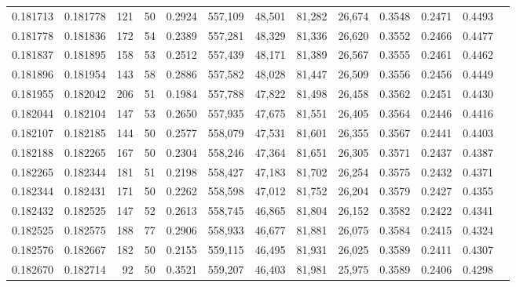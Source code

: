 \begin{tabular}{rrrrrrrrrrrrr}
0.181713 & 0.181778 &   121 &  50 &                                     0.2924 & 557,109 &  48,501 &  81,282 &  26,674 & 0.3548 & 0.2471 & 0.4493 \\
0.181778 & 0.181836 &   172 &  54 &                                     0.2389 & 557,281 &  48,329 &  81,336 &  26,620 & 0.3552 & 0.2466 & 0.4477 \\
0.181837 & 0.181895 &   158 &  53 &                                     0.2512 & 557,439 &  48,171 &  81,389 &  26,567 & 0.3555 & 0.2461 & 0.4462 \\
0.181896 & 0.181954 &   143 &  58 &                                     0.2886 & 557,582 &  48,028 &  81,447 &  26,509 & 0.3556 & 0.2456 & 0.4449 \\
0.181955 & 0.182042 &   206 &  51 &                                     0.1984 & 557,788 &  47,822 &  81,498 &  26,458 & 0.3562 & 0.2451 & 0.4430 \\
0.182044 & 0.182104 &   147 &  53 &                                     0.2650 & 557,935 &  47,675 &  81,551 &  26,405 & 0.3564 & 0.2446 & 0.4416 \\
0.182107 & 0.182185 &   144 &  50 &                                     0.2577 & 558,079 &  47,531 &  81,601 &  26,355 & 0.3567 & 0.2441 & 0.4403 \\
0.182188 & 0.182265 &   167 &  50 &                                     0.2304 & 558,246 &  47,364 &  81,651 &  26,305 & 0.3571 & 0.2437 & 0.4387 \\
0.182265 & 0.182344 &   181 &  51 &                                     0.2198 & 558,427 &  47,183 &  81,702 &  26,254 & 0.3575 & 0.2432 & 0.4371 \\
0.182344 & 0.182431 &   171 &  50 &                                     0.2262 & 558,598 &  47,012 &  81,752 &  26,204 & 0.3579 & 0.2427 & 0.4355 \\
0.182432 & 0.182525 &   147 &  52 &                                     0.2613 & 558,745 &  46,865 &  81,804 &  26,152 & 0.3582 & 0.2422 & 0.4341 \\
0.182525 & 0.182575 &   188 &  77 &                                     0.2906 & 558,933 &  46,677 &  81,881 &  26,075 & 0.3584 & 0.2415 & 0.4324 \\
0.182576 & 0.182667 &   182 &  50 &                                     0.2155 & 559,115 &  46,495 &  81,931 &  26,025 & 0.3589 & 0.2411 & 0.4307 \\
0.182670 & 0.182714 &    92 &  50 &                                     0.3521 & 559,207 &  46,403 &  81,981 &  25,975 & 0.3589 & 0.2406 & 0.4298 \\

\end{tabular}
